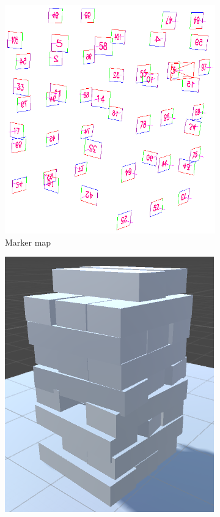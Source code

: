\begin{figure}[p]
\hspace*{\fill}
\begin{subfigure}{0.3\textwidth}
\includegraphics[width=\linewidth,keepaspectratio]{images/implementation/map}
\caption{Marker map} \label{fig:c}
\end{subfigure}
\hspace*{\fill}
\begin{subfigure}{0.3\textwidth}
\includegraphics[width=\linewidth,keepaspectratio]{images/implementation/reconstructionportrait}

\end{subfigure}
\end{figure}
